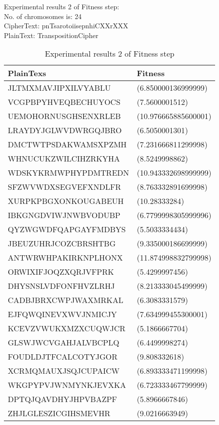 \textsf{Experimental results 2 of Fitness step:}\\
    \colorbox{blue!30}{\textsf{     No. of chromosomes is: 24}}\\
    \colorbox{blue!30}{\textsf{     CipherText: pnTsarotoiisepnhiCXXrXXX}}\\
    \colorbox{blue!30}{\textsf{     PlainText: TranspositionCipher}}

\begin{table}[H]
\centering
\begin{tabular}{l l}
    \hline
    \cellcolor[gray]{0.9} PlainTexs& \cellcolor[gray]{0.9} Fitness\\ \hline
    JLTMXMAVJIPXILVYABLU&(6.850000136999999)\\ \hline  
VCGPBPYHVEQBECHUYOCS&(7.5600001512)\\ \hline  
UEMOHORNUSGHSENXRLEB&(10.976665885600001)\\ \hline  
LRAYDYJGLWVDWRGQJBRO&(6.5050001301)\\ \hline  
DMCTWTPSDAKWAMSXPZMH&(7.231666811299998)\\ \hline  
WHNUCUKZWILCIHZRKYHA&(8.5249998862)\\ \hline  
WDSKYKRMWPHYPDMTREDN&(10.943332698999999)\\ \hline  
SFZWVWDXSEGVEFXNDLFR&(8.763332891699998)\\ \hline  
XURPKPBGXONKOUGABEUH&(10.28333284)\\ \hline  
IBKGNGDVIWJNWBVODUBP&(6.7799998305999996)\\ \hline  
QYZWGWDFQAPGAYFMDBYS&(5.5033334434)\\ \hline  
JBEUZUHRJCOZCBRSHTBG&(9.335000186699999)\\ \hline  
ANTWRWHPAKIRKNPLHONX&(11.874998832799998)\\ \hline  
ORWIXIFJOQZXQRJVFPRK&(5.4299997456)\\ \hline  
DHYSNSLVDFONFHVZLRHJ&(8.213333045499999)\\ \hline  
CADBJBRXCWPJWAXMRKAL&(6.3083331579)\\ \hline  
EJFQWQINEVXWVJNMICJY&(7.634999455300001)\\ \hline  
KCEVZVWUKXMZXCUQWJCR&(5.1866667704)\\ \hline  
GLSWJWCVGAHJALVBCPLQ&(6.4499998274)\\ \hline  
FOUDLDJTFCALCOTYJGOR&(9.808332618)\\ \hline  
XCRMQMAUXJSQJCUPAICW&(6.893333471199998)\\ \hline  
WKGPYPVJWNMYNKJEVXKA&(6.723333467799999)\\ \hline  
DPTQJQAVDHYJHPVBAZPF&(5.8966667846)\\ \hline  
ZHJLGLESZICGIHSMEVHR&(9.0216663949)\\ \hline  
\end{tabular}
\caption{Experimental results 2 of Fitness step}

\end{table}


